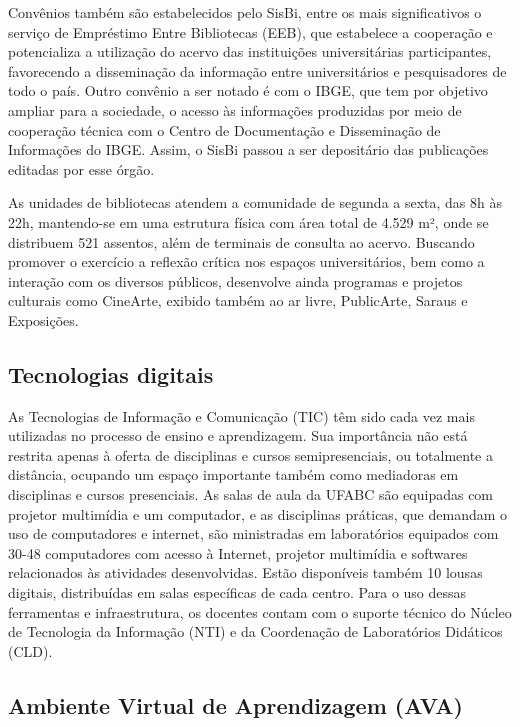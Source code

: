 Convênios também são estabelecidos pelo SisBi, entre os mais significativos o
serviço de Empréstimo Entre Bibliotecas (EEB), que estabelece a cooperação e
potencializa a utilização do acervo das instituições universitárias
participantes, favorecendo a disseminação da informação entre universitários e
pesquisadores de todo o país. Outro convênio a ser notado é com o IBGE, que tem
por objetivo ampliar para a sociedade, o acesso às informações produzidas por
meio de cooperação técnica com o Centro de Documentação e Disseminação de
Informações do IBGE.
Assim, o SisBi passou a ser depositário das publicações editadas por esse órgão.

As unidades de bibliotecas atendem a comunidade de segunda a sexta, das 8h às
22h, mantendo-se em uma estrutura física com área total de 4.529 m², onde se
distribuem 521 assentos, além de terminais de consulta ao acervo.
Buscando promover o exercício a reflexão crítica nos espaços universitários,
bem como a interação com os diversos públicos, desenvolve ainda programas e
projetos culturais como CineArte, exibido também ao ar livre, PublicArte,
Saraus e Exposições.

\subsection{Tecnologias digitais}

As Tecnologias de Informação e Comunicação (TIC) têm sido cada vez mais
utilizadas no processo de ensino e aprendizagem. Sua importância não está
restrita apenas à oferta de disciplinas e cursos semipresenciais, ou totalmente
a distância, ocupando um espaço importante também como mediadoras em
disciplinas e cursos presenciais.
As salas de aula da UFABC são equipadas com projetor multimídia e um
computador, e as disciplinas práticas, que demandam o uso de computadores e
internet, são ministradas em laboratórios equipados com 30-48 computadores com
acesso à Internet, projetor multimídia e softwares relacionados às atividades
desenvolvidas. 
Estão disponíveis também 10 lousas digitais, distribuídas em salas específicas
de cada centro. 
Para o uso dessas ferramentas e infraestrutura, os docentes contam com o
suporte técnico do Núcleo de Tecnologia da Informação (NTI) e da Coordenação de
Laboratórios Didáticos (CLD).

\subsection{Ambiente Virtual de Aprendizagem (AVA)}

